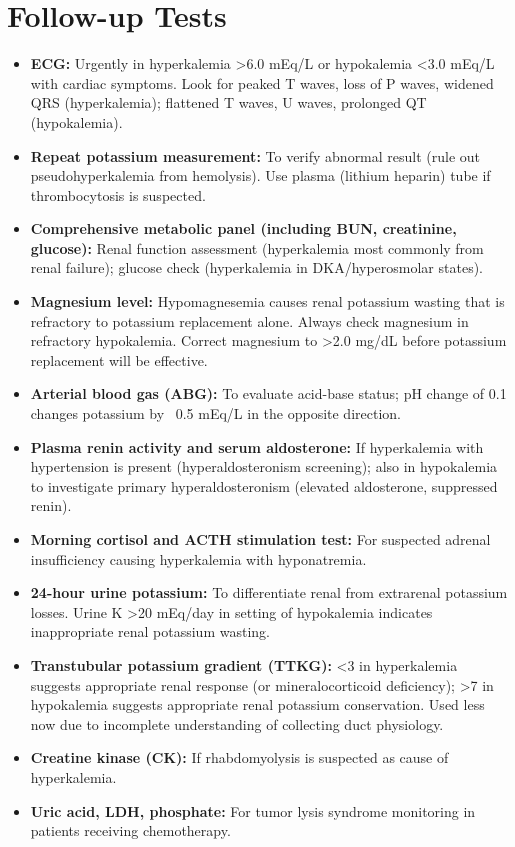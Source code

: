 \section*{Follow-up Tests}
\begin{itemize}
  \item \textbf{ECG:} Urgently in hyperkalemia >6.0 mEq/L or hypokalemia <3.0 mEq/L with cardiac symptoms. Look for peaked T waves, loss of P waves, widened QRS (hyperkalemia); flattened T waves, U waves, prolonged QT (hypokalemia).
  \item \textbf{Repeat potassium measurement:} To verify abnormal result (rule out pseudohyperkalemia from hemolysis). Use plasma (lithium heparin) tube if thrombocytosis is suspected.
  \item \textbf{Comprehensive metabolic panel (including BUN, creatinine, glucose):} Renal function assessment (hyperkalemia most commonly from renal failure); glucose check (hyperkalemia in DKA/hyperosmolar states).
  \item \textbf{Magnesium level:} Hypomagnesemia causes renal potassium wasting that is refractory to potassium replacement alone. Always check magnesium in refractory hypokalemia. Correct magnesium to >2.0 mg/dL before potassium replacement will be effective.
  \item \textbf{Arterial blood gas (ABG):} To evaluate acid-base status; pH change of 0.1 changes potassium by ~0.5 mEq/L in the opposite direction.
  \item \textbf{Plasma renin activity and serum aldosterone:} If hyperkalemia with hypertension is present (hyperaldosteronism screening); also in hypokalemia to investigate primary hyperaldosteronism (elevated aldosterone, suppressed renin).
  \item \textbf{Morning cortisol and ACTH stimulation test:} For suspected adrenal insufficiency causing hyperkalemia with hyponatremia.
  \item \textbf{24-hour urine potassium:} To differentiate renal from extrarenal potassium losses. Urine K >20 mEq/day in setting of hypokalemia indicates inappropriate renal potassium wasting.
  \item \textbf{Transtubular potassium gradient (TTKG):} <3 in hyperkalemia suggests appropriate renal response (or mineralocorticoid deficiency); >7 in hypokalemia suggests appropriate renal potassium conservation. Used less now due to incomplete understanding of collecting duct physiology.
  \item \textbf{Creatine kinase (CK):} If rhabdomyolysis is suspected as cause of hyperkalemia.
  \item \textbf{Uric acid, LDH, phosphate:} For tumor lysis syndrome monitoring in patients receiving chemotherapy.
\end{itemize}

